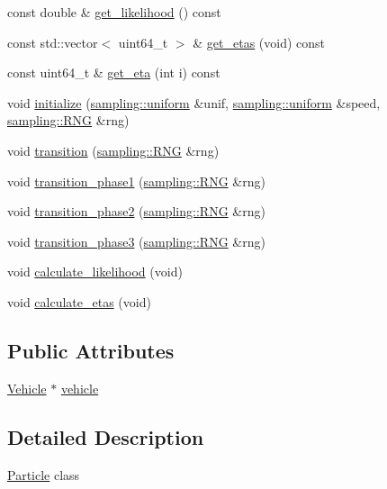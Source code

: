 \begin{DoxyCompactItemize}
\item 
const double \& \hyperlink{classgtfs_1_1Particle_a507c1c0b364d3e06adf554f0249392ba}{get\+\_\+likelihood} () const 
\item 
const std\+::vector$<$ uint64\+\_\+t $>$ \& \hyperlink{classgtfs_1_1Particle_a61c700bd244635eab0669717a2a945ec}{get\+\_\+etas} (void) const 
\item 
const uint64\+\_\+t \& \hyperlink{classgtfs_1_1Particle_ac95ea6946e8c325d2de1b49df7fa79f7}{get\+\_\+eta} (int i) const 
\item 
void \hyperlink{classgtfs_1_1Particle_a4b1e356f32d4557d06c9ed59467a5b27}{initialize} (\hyperlink{classsampling_1_1uniform}{sampling\+::uniform} \&unif, \hyperlink{classsampling_1_1uniform}{sampling\+::uniform} \&speed, \hyperlink{classsampling_1_1RNG}{sampling\+::\+R\+NG} \&rng)
\item 
void \hyperlink{classgtfs_1_1Particle_a18aeb1ccbc395210f80c18f9d0a0095c}{transition} (\hyperlink{classsampling_1_1RNG}{sampling\+::\+R\+NG} \&rng)
\item 
void \hyperlink{classgtfs_1_1Particle_a5e964d5aa4698335de3c75938e55f5cd}{transition\+\_\+phase1} (\hyperlink{classsampling_1_1RNG}{sampling\+::\+R\+NG} \&rng)
\item 
void \hyperlink{classgtfs_1_1Particle_ad9374830814c89b2d5c0af705bda8849}{transition\+\_\+phase2} (\hyperlink{classsampling_1_1RNG}{sampling\+::\+R\+NG} \&rng)
\item 
void \hyperlink{classgtfs_1_1Particle_a68043b2380d8f530d648dd99e5a85101}{transition\+\_\+phase3} (\hyperlink{classsampling_1_1RNG}{sampling\+::\+R\+NG} \&rng)
\item 
void \hyperlink{classgtfs_1_1Particle_a88627efbe0eb2e289315ae82627d3a39}{calculate\+\_\+likelihood} (void)
\item 
void \hyperlink{classgtfs_1_1Particle_aa71d322362f6eb431f70f78cdc8887a8}{calculate\+\_\+etas} (void)
\end{DoxyCompactItemize}
\subsection*{Public Attributes}
\begin{DoxyCompactItemize}
\item 
\hyperlink{classgtfs_1_1Vehicle}{Vehicle} $\ast$ \hyperlink{classgtfs_1_1Particle_a81c313d505ecb592d79463f167dfb76c}{vehicle}
\end{DoxyCompactItemize}


\subsection{Detailed Description}
\hyperlink{classgtfs_1_1Particle}{Particle} class

